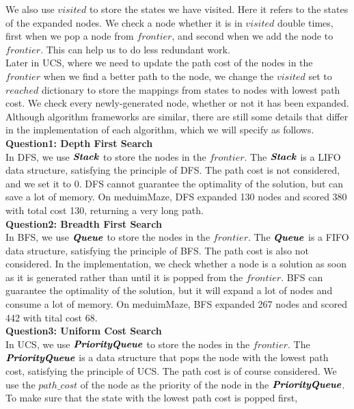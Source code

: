 \documentclass[UTF8]{ctexart}
\begin{document}
We also use $visited$ to store the states we have visited. Here it refers to the states of the expanded nodes. We check a node whether it is in $visited$ double times, first when we pop a node from $frontier$, and second when we add the node to $frontier$.
This can help us to do less redundant work.\\
Later in UCS, where we need to update the path cost of the nodes in the $frontier$ when we find a better path to the node,
we change the $visited$ set to $reached$ dictionary to store the mappings from states to nodes with lowest path cost. We check every newly-generated node, whether or not it has been expanded.\\
Although algorithm frameworks are similar, there are still some details that differ in the implementation of each algorithm, which we will specify as follows.\\
\textbf{Question1: Depth First Search}\\
In DFS, we use $\textbf{\textit{Stack}}$ to store the nodes in the $frontier$. The $\textbf{\textit{Stack}}$ is a LIFO data structure, satisfying the principle of DFS.
The path cost is not considered, and we set it to 0. DFS cannot guarantee the optimality of the solution, but can save a lot of memory. On meduimMaze, 
DFS expanded 130 nodes and scored 380 with total cost 130, returning a very long path.\\
\textbf{Question2: Breadth First Search}\\
In BFS, we use $\textbf{\textit{Queue}}$ to store the nodes in the $frontier$. The $\textbf{\textit{Queue}}$ is a FIFO data structure, satisfying the principle of BFS.
The path cost is also not considered. In the implementation, we check whether a node is a solution as soon as it is generated rather than until it is popped from the $frontier$.
BFS can guarantee the optimality of the solution, but it will expand a lot of nodes and consume a lot of memory. On meduimMaze, BFS expanded 267 nodes and scored 442 with tital cost 68.\\
\textbf{Question3: Uniform Cost Search}\\
In UCS, we use $\textbf{\textit{PriorityQueue}}$ to store the nodes in the $frontier$. The $\textbf{\textit{PriorityQueue}}$ is a data structure that pops the node with the lowest path cost, satisfying the principle of UCS.
The path cost is of course considered. We use the $path\_cost$ of the node as the priority of the node in the $\textbf{\textit{PriorityQueue}}$. To make sure that the state with the lowest path cost is popped first, 
\end{document}
